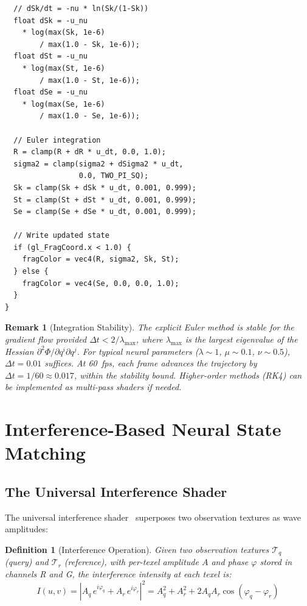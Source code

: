 \documentclass[11pt,twocolumn,a4paper]{article}
\newtheorem{definition}[theorem]{Definition}
\newtheorem{remark}[theorem]{Remark}
\newcommand{\Pot}{\Phi}
\newcommand{\Tex}{\mathcal{T}}
\begin{document}
\begin{lstlisting}
  // dSk/dt = -nu * ln(Sk/(1-Sk))
  float dSk = -u_nu
    * log(max(Sk, 1e-6)
        / max(1.0 - Sk, 1e-6));
  float dSt = -u_nu
    * log(max(St, 1e-6)
        / max(1.0 - St, 1e-6));
  float dSe = -u_nu
    * log(max(Se, 1e-6)
        / max(1.0 - Se, 1e-6));

  // Euler integration
  R = clamp(R + dR * u_dt, 0.0, 1.0);
  sigma2 = clamp(sigma2 + dSigma2 * u_dt,
                 0.0, TWO_PI_SQ);
  Sk = clamp(Sk + dSk * u_dt, 0.001, 0.999);
  St = clamp(St + dSt * u_dt, 0.001, 0.999);
  Se = clamp(Se + dSe * u_dt, 0.001, 0.999);

  // Write updated state
  if (gl_FragCoord.x < 1.0) {
    fragColor = vec4(R, sigma2, Sk, St);
  } else {
    fragColor = vec4(Se, 0.0, 0.0, 1.0);
  }
}
\end{lstlisting}

\begin{remark}[Integration Stability]
The explicit Euler method is stable for the gradient flow provided $\Delta t < 2/\lambda_{\max}$, where $\lambda_{\max}$ is the largest eigenvalue of the Hessian $\partial^2 \Pot / \partial q^i \partial q^j$.
For typical neural parameters ($\lambda \sim 1$, $\mu \sim 0.1$, $\nu \sim 0.5$), $\Delta t = 0.01$ suffices.
At 60~fps, each frame advances the trajectory by $\Delta t = 1/60 \approx 0.017$, within the stability bound.
Higher-order methods (RK4) can be implemented as multi-pass shaders if needed.
\end{remark}



\section{Interference-Based Neural State Matching}
\label{sec:interference}

\subsection{The Universal Interference Shader}

The universal interference shader~\cite{sachikonye2026gpu} superposes two observation textures as wave amplitudes:

\begin{definition}[Interference Operation]
\label{def:interference}
Given two observation textures $\Tex_q$ (query) and $\Tex_r$ (reference), with per-texel amplitude $A$ and phase $\varphi$ stored in channels R and G, the interference intensity at each texel is:
\begin{equation}
\boxed{I(u,v) = \left|A_q\,e^{i\varphi_q} + A_r\,e^{i\varphi_r}\right|^2 = A_q^2 + A_r^2 + 2A_q A_r \cos(\varphi_q - \varphi_r)}
\label{eq:interference}
\end{equation}
\end{definition}
\end{document}
